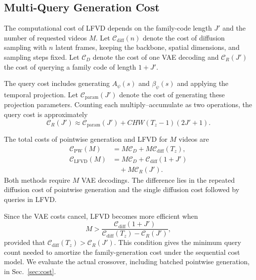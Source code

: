 \subsection{Multi-Query Generation Cost}
\label{sec:query}

The computational cost of LFVD depends on the family-code length
$J'$ and the number of requested videos $M$.
Let $\mathcal C_{\mathrm{diff}}(n)$ denote the cost of diffusion
sampling with $n$ latent frames, keeping the backbone, spatial
dimensions, and sampling steps fixed.
Let $\mathcal C_D$ denote the cost of one VAE decoding and
$\mathcal C_R(J')$ the cost of querying a family code of length
$1+J'$.

The query cost includes generating $A_\psi(s)$ and $\beta_\psi(s)$
and applying the temporal projection.
Let $\mathcal C_{\mathrm{param}}(J')$ denote the cost of generating
these projection parameters. Counting each multiply--accumulate
as two operations, the query cost is approximately
\begin{equation}
    \mathcal C_R(J')
    \approx \mathcal C_{\mathrm{param}}(J')
    +CHW(T_z-1)(2J'+1).
    \label{eq:query_cost}
\end{equation}

The total costs of pointwise generation
and LFVD for $M$ videos are
\begin{equation}
\begin{aligned}
    \mathcal C_{\mathrm{PW}}(M)
    &=M\mathcal C_D+M\mathcal C_{\mathrm{diff}}(T_z),\\
    \mathcal C_{\mathrm{LFVD}}(M)
    &=M\mathcal C_D+\mathcal C_{\mathrm{diff}}(1+J')\\
    &\quad+M\mathcal C_R(J').
\end{aligned}
\label{eq:generation_cost}
\end{equation}
Both methods require $M$ VAE decodings. The difference lies in
the repeated diffusion cost of pointwise generation and the
single diffusion cost followed by queries in LFVD.

Since the VAE costs cancel, LFVD becomes more efficient when
\begin{equation}
    M>
    \frac{\mathcal C_{\mathrm{diff}}(1+J')}
    {\mathcal C_{\mathrm{diff}}(T_z)-\mathcal C_R(J')},
    \label{eq:cost_crossover}
\end{equation}
provided that
$\mathcal C_{\mathrm{diff}}(T_z)>\mathcal C_R(J')$.
This condition gives the minimum query count needed to amortize
the family-generation cost under the sequential cost model.
We evaluate the actual crossover, including batched pointwise
generation, in Sec.~\ref{sec:cost}.
